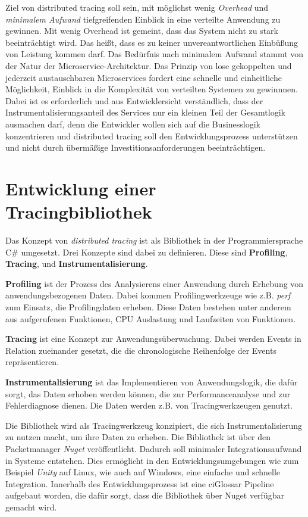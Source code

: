 Ziel von distributed tracing soll sein, mit möglichst wenig \emph{Overhead} und \emph{minimalem Aufwand} tiefgreifenden Einblick in eine verteilte Anwendung zu gewinnen. Mit wenig Overhead ist gemeint, dass das System nicht zu stark beeinträchtigt wird. Das heißt, dass es zu keiner unvereantwortlichen Einbüßung von Leistung kommen darf. Das Bedürfnis nach minimalem Aufwand stammt von der Natur der Microservice-Architektur. Das Prinzip von lose gekoppelten und jederzeit austauschbaren Microservices fordert eine schnelle und einheitliche  Möglichkeit, Einblick in die Komplexität von verteilten Systemen zu gewinnnen. Dabei ist es erforderlich und aus Entwicklersicht verständlich, dass der Instrumentalisierungsanteil des Services nur ein kleinen Teil der Gesamtlogik ausmachen darf, denn die Entwickler wollen sich auf die Businesslogik konzentrieren und distributed tracing soll den Entwicklungsprozess unterstützen und nicht durch übermäßige Investitionsanforderungen beeinträchtigen.

 
\section{Entwicklung einer Tracingbibliothek}
\label{subsection:Entwicklung einer Tracingbibliothek}

Das Konzept von \emph{distributed tracing} ist als Bibliothek in der Programmiersprache C\# umgesetzt. Drei Konzepte sind dabei zu definieren. Diese sind \textbf{Profiling}, \textbf{Tracing}, und \textbf{Instrumentalisierung}.  

	\textbf{Profiling} ist der Prozess des Analysierens einer Anwendung durch Erhebung von anwendungsbezogenen Daten. Dabei kommen Profilingwerkzeuge wie z.B. \emph{perf} zum Einsatz, die Profilingdaten erheben. Diese Daten bestehen unter anderem aus aufgerufenen Funktionen, CPU Auslastung und Laufzeiten von Funktionen.
	
	\textbf{Tracing} ist eine Konzept zur Anwendungsüberwachung. Dabei werden Events in Relation zueinander gesetzt, die die chronologische Reihenfolge der Events repräsentieren.
	
	\textbf{Instrumentalisierung} ist das Implementieren von Anwendungslogik, die dafür sorgt, das Daten erhoben werden können, die zur Performanceanalyse und zur Fehlerdiagnose dienen. Die Daten werden z.B. von Tracingwerkzeugen genutzt.

Die Bibliothek wird als Tracingwerkzeug konzipiert, die sich Instrumentalisierung zu nutzen macht, um ihre Daten zu erheben.
Die Bibliothek ist über den Packetmanager \emph{Nuget} veröffentlicht. Dadurch soll minimaler Integrationsaufwand in Systeme entstehen. Dies ermöglicht in den Entwicklungsumgebungen wie zum Beispiel \emph{Unity} auf Linux, wie auch auf Windows, eine einfache und schnelle Integration. Innerhalb des Entwicklungsprozess ist eine \gls{ciGlossar} Pipeline aufgebaut worden, die dafür sorgt, dass die Bibliothek über Nuget verfügbar gemacht wird.

